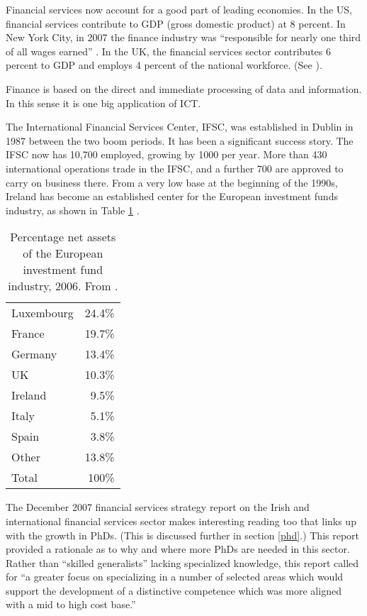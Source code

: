 \documentclass{article}
\begin{document}
Financial services now account for a good part of leading 
economies.  In the US, financial services contribute to GDP 
(gross domestic product) at 
8 percent.  In New York City, in 2007 the finance industry was 
``responsible for nearly one third of all wages earned''
\cite{story}.  In the UK, the financial services sector contributes
6 percent to GDP and employs 4 percent of the national workforce.
(See \cite{expert}).  

Finance is based on the direct and immediate processing of 
data and information. In this sense it is one big application 
of ICT.  


The International Financial Services Center, IFSC, was established 
in Dublin in 1987 
between the two boom periods.  It has been a significant success 
story.  The IFSC 
now has 10,700 employed, growing by 1000 per year.  More than 430 
international 
operations trade in the IFSC, and a further 700 are approved to 
carry on business 
there.  
From a very low base at the beginning of the 1990s, Ireland has become an 
established center for the European investment funds industry, as 
shown in Table \ref{tab1} \cite{expert}.  




\begin{table}
\begin{center}
\begin{tabular}{lr}\hline
Luxembourg & 24.4\% \\
France    & 19.7\% \\
Germany   & 13.4\% \\
UK        & 10.3\% \\
Ireland   & 9.5\% \\
Italy     & 5.1\% \\
Spain     & 3.8\% \\
Other    & 13.8\% \\
Total    & 100\% \\ \hline
\end{tabular}
\end{center}
\caption{Percentage net assets of the European investment fund industry, 2006.
From \cite{expert}.}
\label{tab1}
\end{table}

The December 2007 financial services strategy report \cite{expert} 
on the Irish and international financial 
services sector makes interesting reading too that 
links up with the 
growth in PhDs.  (This is discussed further in 
section \ref{phd}.)  This report 
 provided a rationale 
as to why and where more PhDs are needed in this sector.  
Rather than 
``skilled generalists'' lacking specialized knowledge, this report called 
for ``a greater 
focus on specializing in a number of selected areas which would support the 
development of a distinctive competence which was more aligned 
with a mid to high 
cost base.''
\end{document}
